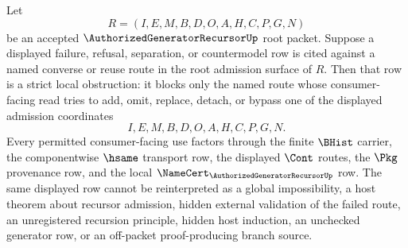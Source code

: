 \begin{corollary}
\label{cor:authorized-generator-recursor-admission-strict-obstruction}
Let
$$
R=(I,E,M,B,D,O,A,H,C,P,G,N)
$$
be an accepted $\AuthorizedGeneratorRecursorUp$ root packet. Suppose a displayed failure, refusal, separation, or countermodel row is cited against a named converse or reuse route in the root admission surface of $R$. Then that row is a strict local obstruction: it blocks only the named route whose consumer-facing read tries to add, omit, replace, detach, or bypass one of the displayed admission coordinates
$$
I,E,M,B,D,O,A,H,C,P,G,N.
$$
Every permitted consumer-facing use factors through the finite $\BHist$ carrier, the componentwise $\hsame$ transport row, the displayed $\Cont$ routes, the $\Pkg$ provenance row, and the local $\NameCert_{\AuthorizedGeneratorRecursorUp}$ row. The same displayed row cannot be reinterpreted as a global impossibility, a host theorem about recursor admission, hidden external validation of the failed route, an unregistered recursion principle, hidden host induction, an unchecked generator row, or an off-packet proof-producing branch source.
\end{corollary}
